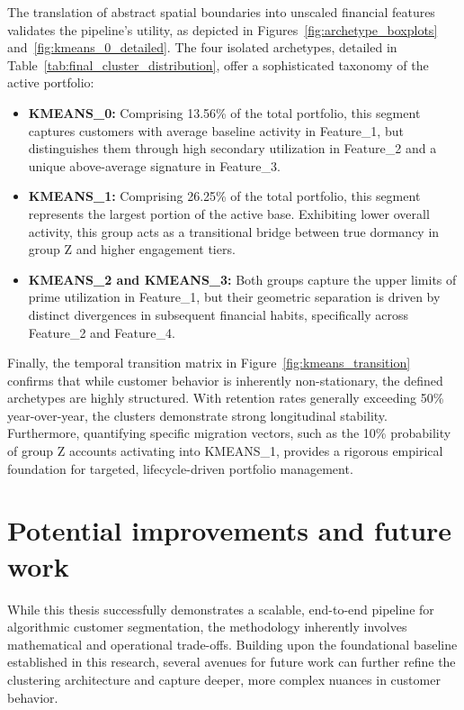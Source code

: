 The translation of abstract spatial boundaries into unscaled financial features validates the pipeline's utility, as depicted in Figures~\ref{fig:archetype_boxplots} and~\ref{fig:kmeans_0_detailed}.
The four isolated archetypes, detailed in Table~\ref{tab:final_cluster_distribution}, offer a sophisticated taxonomy of the active portfolio:
\begin{itemize}
    \item \textbf{KMEANS\_0:} Comprising 13.56\% of the total portfolio, this segment captures customers with average baseline activity in Feature\_1, but distinguishes them through high secondary utilization in Feature\_2 and a unique above-average signature in Feature\_3.
    \item \textbf{KMEANS\_1:} Comprising 26.25\% of the total portfolio, this segment represents the largest portion of the active base.
    Exhibiting lower overall activity, this group acts as a transitional bridge between true dormancy in group Z and higher engagement tiers.
    \item \textbf{KMEANS\_2 and KMEANS\_3:} Both groups capture the upper limits of prime utilization in Feature\_1, but their geometric separation is driven by distinct divergences in subsequent financial habits, specifically across Feature\_2 and Feature\_4.
\end{itemize}

Finally, the temporal transition matrix in Figure~\ref{fig:kmeans_transition} confirms that while customer behavior is inherently non-stationary, the defined archetypes are highly structured.
With retention rates generally exceeding 50\% year-over-year, the clusters demonstrate strong longitudinal stability.
Furthermore, quantifying specific migration vectors, such as the 10\% probability of group Z accounts activating into KMEANS\_1, provides a rigorous empirical foundation for targeted, lifecycle-driven portfolio management.

\chapter{Potential improvements and future work}
\label{chap:Improvements}

While this thesis successfully demonstrates a scalable, end-to-end pipeline for algorithmic customer segmentation, the methodology inherently involves mathematical and operational trade-offs.
Building upon the foundational baseline established in this research, several avenues for future work can further refine the clustering architecture and capture deeper, more complex nuances in customer behavior.
